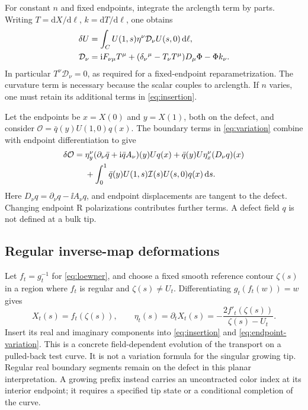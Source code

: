 For constant $n$ and fixed endpoints, integrate the arclength term by
parts. Writing $T=\mathrm dX/\mathrm d\ell$, $k=\mathrm dT/\mathrm d\ell$,
one obtains
\begin{align}\label{eq:displacement}
 \delta U&=\int_C U(1,s)\eta^\nu\mathcal D_\nu U(s,0)\,\mathrm d\ell,\notag\\
 \mathcal D_\nu&=\mathrm i F_{\nu\mu}T^\mu
 +(\delta_\nu{}^\mu-T_\nu T^\mu)D_\mu\Phi-\Phi k_\nu.
\end{align}
In particular $T^\nu\mathcal D_\nu=0$, as required for a fixed-endpoint
reparametrization. The curvature term is necessary because the scalar
couples to arclength. If $n$ varies, one must retain its additional
terms in \eqref{eq:insertion}.

Let the endpoints be $x=X(0)$ and $y=X(1)$, both on the defect, and
consider $\mathcal O=\bar q(y)U(1,0)q(x)$. The boundary terms in
\eqref{eq:variation} combine with endpoint differentiation to give
\begin{align}\label{eq:endpoint-variation}
 \delta\mathcal O={}&\eta_y^\nu(\partial_\nu\bar q+\mathrm i\bar qA_\nu)(y)Uq(x)
 +\bar q(y)U\eta_x^\nu(D_\nu q)(x)\notag\\
 &+\int_0^1\bar q(y)U(1,s)\mathcal I(s)U(s,0)q(x)\,\mathrm d s.
\end{align}
Here $D_\nu q=\partial_\nu q-\ii A_\nu q$, and endpoint displacements
are tangent to the defect. Changing endpoint R polarizations contributes
further terms. A defect field $q$ is not defined at a bulk tip.

\subsection{Regular inverse-map deformations}

Let $f_t=g_t^{-1}$ for \eqref{eq:loewner}, and choose a fixed smooth
reference contour $\zeta(s)$ in a region where $f_t$ is regular and
$\zeta(s)\ne U_t$. Differentiating $g_t(f_t(w))=w$ gives
\begin{equation}\label{eq:inverse-flow}
 X_t(s)=f_t(\zeta(s)),\qquad
 \eta_t(s)=\partial_tX_t(s)
 =-\frac{2f'_t(\zeta(s))}{\zeta(s)-U_t}.
\end{equation}
Insert its real and imaginary components into
\eqref{eq:insertion} and \eqref{eq:endpoint-variation}. This is a
concrete field-dependent evolution of the transport on a pulled-back
test curve. It is not a variation formula for the singular growing tip.
Regular real boundary segments remain on the defect in this planar
interpretation. A growing prefix instead carries an uncontracted color
index at its interior endpoint; it requires a specified tip state or
a conditional completion of the curve.


